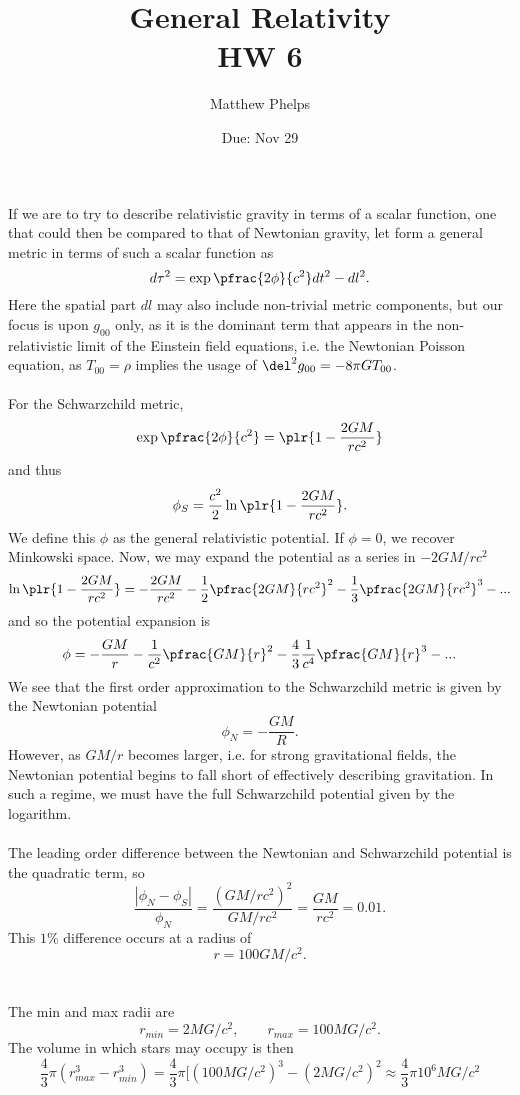 \documentclass[10pt,letterpaper]{article}
\title{General Relativity\\HW 6}
\author{Matthew Phelps}
\date{Due: Nov 29}
\begin{document}
\maketitle

\benum
\item
If we are to try to describe relativistic gravity in terms of a scalar function, one that could then be compared to that of Newtonian gravity, let form a general metric in terms of such a scalar function as
\[
	d\tau^2 = \exp\pfrac{2\phi}{c^2}dt^2 - dl^2.
\]
Here the spatial part $dl$ may also include non-trivial metric components, but our focus is upon $g_{00}$ only, as it is the dominant term that appears in the non-relativistic limit of the Einstein field equations, i.e. the Newtonian Poisson equation, as $T_{00} = \rho$ implies the usage of $\del^2 g_{00} = -8\pi GT_{00}$. 
\\ \\
For the Schwarzchild metric,
\[
	\exp\pfrac{2\phi}{c^2} = \plr{ 1-\frac{2GM}{rc^2}}
\]
and thus
\[
	\phi_S  = \frac{c^2}{2} \ln\plr{1-\frac{2GM}{rc^2}}.
\]
We define this $\phi$ as the general relativistic potential. If $\phi = 0$, we recover Minkowski space. Now, we may expand the potential as a series in $-2GM/rc^2$
\[
	 \ln\plr{1-\frac{2GM}{rc^2}} = -\frac{2GM}{rc^2} - \frac12 \pfrac{2GM}{rc^2}^2 - \frac13 \pfrac{2GM}{rc^2}^3 - ...
\]
and so the potential expansion is 
\[
	\phi = -\frac{GM}{r} - \frac{1}{c^2}\pfrac{GM}{r}^2-\frac43\frac{1}{c^4} \pfrac{GM}{r}^3-...
\]
We see that the first order approximation to the Schwarzchild metric is given by the Newtonian potential
\[
	\phi_{N} = -\frac{GM}{R}.
\]
However, as $GM/r$ becomes larger, i.e. for strong gravitational fields, the Newtonian potential begins to fall short of effectively describing gravitation. In such a regime, we must have the full Schwarzchild potential given by the logarithm. \\ \\
The leading order difference between the Newtonian and Schwarzchild potential is the quadratic term, so
\[
	\frac{|\phi_N-\phi_S|}{\phi_N} =\frac{(GM/rc^2)^2}{GM/rc^2} = \frac{GM}{rc^2} =0.01.
\]
This $1\%$ difference occurs at a radius of 
\[
	r= 100GM/c^2.
\]
\\ \\
The min and max radii are
\[
	r_{min} = 2MG/c^2,\qquad r_{max} = 100MG/c^2.
\]
The volume in which stars may occupy is then
\[
	\frac43 \pi (r_{max}^3-r_{min}^3) = \frac43\pi[ (100MG/c^2)^3-(2MG/c^2)^2\approx \frac43\pi 10^6MG/c^2
\]
\end{document}
